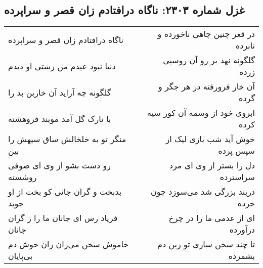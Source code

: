 \begin{center}
\section*{غزل شماره ۲۳۰۳: ناگاه درافتادم زان قصر و سراپرده}
\label{sec:2303}
\begin{longtable}{l p{0.5cm} r}
ناگاه درافتادم زان قصر و سراپرده
&&
در قعر چنین چاهی ناخورده و نابرده
\\
دنیا نبود عیدم من زشتی او دیدم
&&
گلگونه نهد بر رو آن روسپی زرده
\\
گلگونه چه آراید آن خاربن بد را
&&
آن خار فرورفته در هر جگر و گرده
\\
با تارک گل آمد موبند فروهشته
&&
ابروی خود از وسمه آن کور سیه کرده
\\
منگر تو به خلخالش ساق سیهش را بین
&&
خوش آید شب بازی لیک از سپس پرده
\\
رو دست بشو از وی ای صوفی روشسته
&&
دل را بستر از وی ای مرد سراسترده
\\
بدبخت و گران جانی کو بخت از او جوید
&&
دربند بزرگی شد می‌سوزد چون خرده
\\
فریاد رس ای جانان ما را ز گران جانان
&&
ای از عدمی ما را در چرخ درآورده
\\
خاموش سخن می‌ران زان خوش دم بی‌پایان
&&
تا چند سخن سازی تو زین دم بشمرده
\\
\end{longtable}
\end{center}
